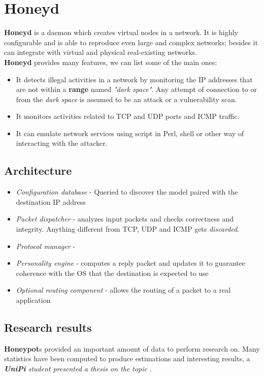 \section{Honeyd}
\textbf{Honeyd} is a daemon which creates virtual nodes in a network.
It is highly configurable and is able to reproduce even large and complex networks;
besides it can integrate with virtual and physical real-existing networks.\\
\textbf{Honeyd} provides many features, we can list some of the main ones:
\begin{itemize}
   \item It detects illegal activities in a network by monitoring the IP addresses that are not within a \textbf{range} named \textit{"dark space"}.
   Any attempt of connection to or from the \textit{dark space} is assumed to be an attack or a vulnerability scan.
   \item It monitors activities related to TCP and UDP ports and ICMP traffic.
   \item It can emulate network services using script in Perl, shell or other way of interacting with the attacker.
\end{itemize}

\subsection{Architecture}
\begin{itemize}
   \item \textit{Configuration database} -
   Queried to discover the model paired with the destination IP address
   \item \textit{Packet dispatcher} -
   analyzes input packets and checks correctness and integrity.
   Anything different from TCP, UDP and ICMP gets \textit{discarded}.
   \item \textit{Protocol manager} -

   \item \textit{Personality engine} -
   computes a reply packet and updates it to guarantee coherence with the OS that the destination is expected to use
   \item \textit{Optional routing component} -
   allows the routing of a packet to a real application
\end{itemize}

\subsection{Research results}
\textbf{Honeypot}s provided an important amount of data to perform research on.
Many statistics have been computed to produce estimations and interesting results,
a \textit{\textbf{UniPi} student presented a thesis on the topic} \smiley.

